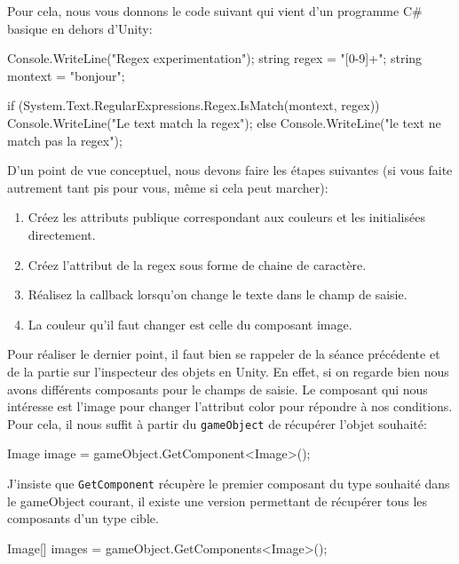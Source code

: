 \documentclass[a4paper,10pt]{article}
\newenvironment{info}%
{\begin{tcolorbox}[breakable,colback=green!5!white,colframe=green!75!black,title=Information]}%
{\end{tcolorbox}}
\newenvironment{boxcode}%
{\begin{tcolorbox}[breakable,colback=gray!5!white,colframe=black]}%
	{\end{tcolorbox}}
\begin{document}
Pour cela, nous vous donnons le code suivant qui vient d'un programme C\# basique en dehors d'Unity:

\begin{boxcode}
\begin{csharpsansbord}
Console.WriteLine("Regex experimentation");
string regex = "[0-9]+";
string montext = "bonjour";

if (System.Text.RegularExpressions.Regex.IsMatch(montext, regex))
	Console.WriteLine("Le text match la regex");
else
	Console.WriteLine("le text ne match pas la regex");

\end{csharpsansbord}
\end{boxcode}


D'un point de vue conceptuel, nous devons faire les étapes suivantes (si vous faite autrement tant pis pour vous, même si cela peut marcher):
\begin{enumerate}
	\item Créez les attributs publique correspondant aux couleurs et les initialisées directement.
	\item Créez l'attribut de la regex sous forme de chaine de caractère.
	\item Réalisez la callback lorsqu'on change le texte dans le champ de saisie.
	\item La couleur qu'il faut changer est celle du composant image.
\end{enumerate}

\begin{info}
Pour réaliser le dernier point, il faut bien se rappeler de la séance précédente et de la partie sur l'inspecteur des objets en Unity. En effet, si on regarde bien nous avons différents composants pour le champs de saisie. Le composant qui nous intéresse est l'image pour changer l'attribut color pour répondre à nos conditions. Pour cela, il nous suffit à partir du \texttt{gameObject} de récupérer l'objet souhaité:

\begin{csharp}
Image image = gameObject.GetComponent<Image>();
\end{csharp}

J'insiste que \texttt{GetComponent} récupère le premier composant du type souhaité dans le gameObject courant, il existe une version permettant de récupérer tous les composants d'un type cible.
\begin{csharp}
Image[] images = gameObject.GetComponents<Image>();
\end{csharp}
\end{info}
\end{document}
